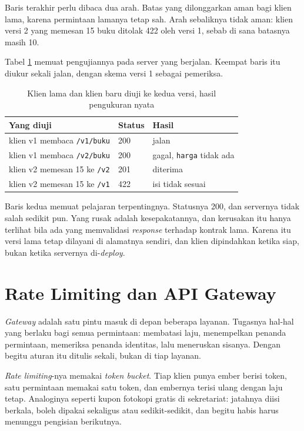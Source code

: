 Baris terakhir perlu dibaca dua arah. Batas yang dilonggarkan aman bagi klien
lama, karena permintaan lamanya tetap sah. Arah sebaliknya tidak aman: klien
versi 2 yang memesan 15 buku ditolak 422 oleh versi 1, sebab di sana batasnya
masih 10.

Tabel \ref{tab:uji-versi} memuat pengujiannya pada server yang berjalan.
Keempat baris itu diukur sekali jalan, dengan skema versi 1 sebagai pemeriksa.

\begin{table}[!htb]
  \centering
  \caption{Klien lama dan klien baru diuji ke kedua versi, hasil pengukuran
           nyata}
  \label{tab:uji-versi}
  \begin{tabularx}{\textwidth}{Xll}
    \hline
    \textbf{Yang diuji} & \textbf{Status} & \textbf{Hasil} \\
    \hline
    klien v1 membaca \texttt{/v1/buku} & 200 & jalan \\
    \hline
    klien v1 membaca \texttt{/v2/buku} & 200 & gagal, \texttt{harga} tidak ada \\
    \hline
    klien v2 memesan 15 ke \texttt{/v2} & 201 & diterima \\
    \hline
    klien v2 memesan 15 ke \texttt{/v1} & 422 & isi tidak sesuai \\
    \hline
  \end{tabularx}
\end{table}

Baris kedua memuat pelajaran terpentingnya. Statusnya 200, dan servernya
tidak salah sedikit pun. Yang rusak adalah kesepakatannya, dan kerusakan itu
hanya terlihat bila ada yang memvalidasi \textit{response} terhadap kontrak lama. Karena
itu versi lama tetap dilayani di alamatnya sendiri, dan klien dipindahkan
ketika siap, bukan ketika servernya di-\textit{deploy}.

\section{Rate Limiting dan API Gateway}

\textit{Gateway} adalah satu pintu masuk di depan beberapa layanan. Tugasnya
hal-hal yang berlaku bagi semua permintaan: membatasi laju, menempelkan
penanda permintaan, memeriksa penanda identitas, lalu meneruskan sisanya.
Dengan begitu aturan itu ditulis sekali, bukan di tiap layanan.

\textit{Rate limiting}-nya memakai \textit{token bucket}. Tiap klien punya ember
berisi token, satu permintaan memakai satu token, dan embernya terisi ulang
dengan laju tetap. Analoginya seperti kupon fotokopi gratis di sekretariat:
jatahnya diisi berkala, boleh dipakai sekaligus atau sedikit-sedikit, dan
begitu habis harus menunggu pengisian berikutnya.

